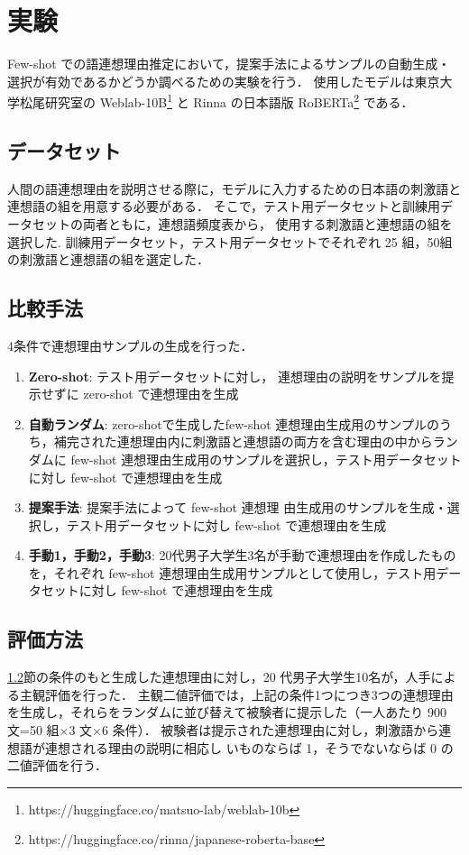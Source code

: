 \documentclass[letter]{ieicej}%
\begin{document}
\section{実験}
\label{sec:experiment}
Few-shot での語連想理由推定において，提案手法によるサンプルの自動生成・選択が有効であるかどうか調べるための実験を行う．
使用したモデルは東京大学松尾研究室の Weblab-10B\footnote{https://huggingface.co/matsuo-lab/weblab-10b} と
Rinna の日本語版 RoBERTa\footnote{https://huggingface.co/rinna/japanese-roberta-base} である．


\subsection{データセット}
\label{sec:dataset}
人間の語連想理由を説明させる際に，モデルに入力するための日本語の刺激語と連想語の組を用意する必要がある．
そこで，テスト用データセットと訓練用データセットの両者ともに，連想語頻度表\cite{水野りか2011連想語頻度表}から， 使用する刺激語と連想語の組を選択した.
訓練用データセット，テスト用データセットでそれぞれ 25 組，50組の刺激語と連想語の組を選定した．


\subsection{比較手法}
\label{sec:comparisons}
4条件で連想理由サンプルの生成を行った．
\begin{enumerate}
    \item {\bf Zero-shot}: テスト用データセットに対し， 連想理由の説明をサンプルを提示せずに zero-shot で連想理由を生成
    \item {\bf 自動ランダム}: zero-shotで生成したfew-shot 連想理由生成用のサンプルのうち，補完された連想理由内に刺激語と連想語の両方を含む理由の中からランダムに few-shot 連想理由生成用のサンプルを選択し，テスト用データセットに対し few-shot で連想理由を生成
    \item { \bf 提案手法}: 提案手法によって few-shot 連想理 由生成用のサンプルを生成・選択し，テスト用データセットに対し few-shot で連想理由を生成
    \item {\bf 手動1，手動2，手動3}: 20代男子大学生3名が手動で連想理由を作成したものを，それぞれ few-shot 連想理由生成用サンプルとして使用し，テスト用データセットに対し few-shot で連想理由を生成
\end{enumerate}


\subsection{評価方法}
\label{sec:evaluation}
\ref{sec:comparisons}節の条件のもと生成した連想理由に対し，20 代男子大学生10名が，人手による主観評価を行った．
主観二値評価では，上記の条件1つにつき3つの連想理由を生成し，それらをランダムに並び替えて被験者に提示した（一人あたり 900 文=50 組×3 文×6 条件）．
被験者は提示された連想理由に対し，刺激語から連想語が連想される理由の説明に相応し いものならば 1，そうでないならば 0 の二値評価を行う．
\end{document}
